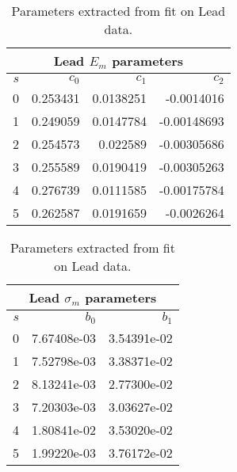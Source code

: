 %
\begin{table}[!ht]
\centering
\begin{tabular}{|r|r|r|r|}
\multicolumn{4}{c}{Lead $E_{m}$ parameters} \\ \hline
$s$ &$c_0$ & $c_1$ & $c_2$\\ \hline \hline
0 & 0.253431 & 0.0138251 & -0.0014016\\ \hline
1 & 0.249059 & 0.0147784 & -0.00148693\\ \hline
2 & 0.254573 & 0.022589 & -0.00305686\\ \hline
3 & 0.255589 & 0.0190419 & -0.00305263\\ \hline
4 & 0.276739 & 0.0111585 & -0.00175784\\ \hline
5 & 0.262587 & 0.0191659 & -0.0026264\\ \hline
\end{tabular}
\caption{Parameters extracted from fit on Lead data. \cite{Taya_thesis}}
\label{tb:sf_Pb_m}
\end{table}
%
\begin{table}[!ht]
\centering
\begin{tabular}{|r|r|r|}
\multicolumn{3}{c}{Lead $\sigma_{m}$ parameters} \\ \hline
$s$ &$b_0$ & $b_1$ \\ \hline
0 & 7.67408e-03 & 3.54391e-02\\ \hline
1 & 7.52798e-03 & 3.38371e-02\\ \hline
2 & 8.13241e-03 & 2.77300e-02\\ \hline
3 & 7.20303e-03 & 3.03627e-02\\ \hline
4 & 1.80841e-02 & 3.53020e-02\\ \hline
5 & 1.99220e-03 & 3.76172e-02\\ \hline
\end{tabular}
\caption{Parameters extracted from fit on Lead data. \cite{Taya_thesis}}
\label{tb:sf_Pb_s}
\end{table}

